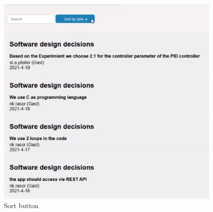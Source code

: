 \begin{enumerate}
\begin{figure}
\centering
\includegraphics[width=0.7\linewidth]{"figures/sort button"}
\caption{Sort button}
\label{fig:sort-button}
\end{figure}

\end{enumerate}




